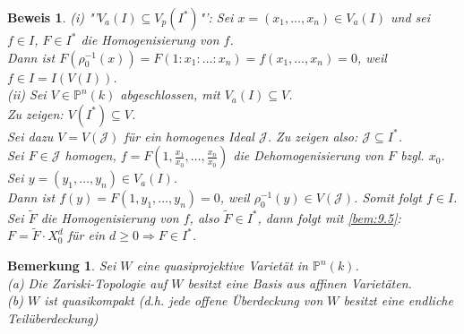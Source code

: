 \documentclass[a4paper,12pt]{report}
\theoremstyle{break}
\newtheorem{Bem}[Def]{Bemerkung}
\theoremstyle{nonumberbreak}
\theoremstyle{nonumberplain}
\newtheorem{Bew}{Beweis}
\begin{document}
\begin{Bew}
(i) "'$V_a(I)\subseteq V_p(I^*)$"': Sei $x=(x_1,\dots,x_n)\in V_a(I)$ und sei $f\in I$, $F\in I^*$ die Homogenisierung von $f$.\\
Dann ist $F(\rho_0^{-1}(x))=F(1:x_1:\dots:x_n)=f(x_1,\dots,x_n)=0$, weil $f\in I =I(V(I))$.\\
(ii) Sei $V\in \mathbb{P}^n(k)$ abgeschlossen, mit $V_a(I)\subseteq V$.\\
Zu zeigen: $V(I^*)\subseteq V$.\\
Sei dazu $V=V(\mathcal{J})$ für ein homogenes Ideal $\mathcal{J}$. Zu zeigen also: $\mathcal{J}\subseteq I^*$.\\
Sei $F\in \mathcal{J}$ homogen, $f=F(1,\frac{x_1}{x_0},\dots,\frac{x_n}{x_0})$ die Dehomogenisierung von $F$ bzgl. $x_0$.\\
Sei $y=(y_1,\dots,y_n)\in V_a(I)$.\\
Dann ist $f(y)=F(1,y_1,\dots,y_n)=0$, weil $\rho_0^{-1}(y)\in V(\mathcal{J})$. Somit folgt $f\in I$.\\
Sei $\tilde{F}$ die Homogenisierung von $f$, also $\tilde{F}\in I^*$, dann folgt mit \ref{bem:9.5}: $F=\tilde{F}\cdot X_0^d$ für ein $d\geq0\Rightarrow F\in I^*$.
\end{Bew}



\begin{Bem}
\label{bem:9.9}
Sei $W$ eine quasiprojektive Varietät in $\mathbb{P}^n(k)$.\\
(a) Die Zariski-Topologie auf $W$ besitzt eine Basis aus affinen Varietäten.\\
(b) $W$ ist quasikompakt (d.h. jede offene Überdeckung von $W$ besitzt eine endliche Teilüberdeckung)
\end{Bem}
\end{document}
